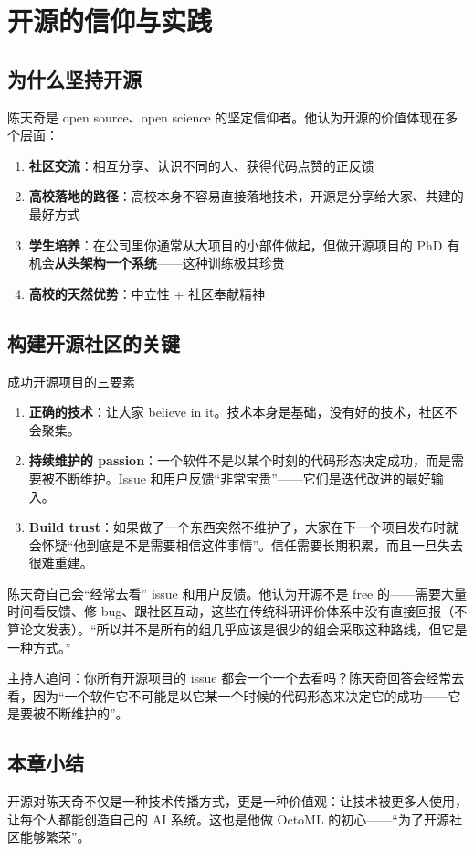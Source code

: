 \section{开源的信仰与实践}

\subsection{为什么坚持开源}

陈天奇是 open source、open science 的坚定信仰者。他认为开源的价值体现在多个层面：

\begin{enumerate}
    \item \textbf{社区交流}：相互分享、认识不同的人、获得代码点赞的正反馈
    \item \textbf{高校落地的路径}：高校本身不容易直接落地技术，开源是分享给大家、共建的最好方式
    \item \textbf{学生培养}：在公司里你通常从大项目的小部件做起，但做开源项目的 PhD 有机会\textbf{从头架构一个系统}------这种训练极其珍贵
    \item \textbf{高校的天然优势}：中立性 + 社区奉献精神
\end{enumerate}

\subsection{构建开源社区的关键}

\begin{importantbox}{成功开源项目的三要素}
\begin{enumerate}
    \item \textbf{正确的技术}：让大家 believe in it。技术本身是基础，没有好的技术，社区不会聚集。
    \item \textbf{持续维护的 passion}：一个软件不是以某个时刻的代码形态决定成功，而是需要被不断维护。Issue 和用户反馈``非常宝贵''------它们是迭代改进的最好输入。
    \item \textbf{Build trust}：如果做了一个东西突然不维护了，大家在下一个项目发布时就会怀疑``他到底是不是需要相信这件事情''。信任需要长期积累，而且一旦失去很难重建。
\end{enumerate}
\end{importantbox}

陈天奇自己会``经常去看'' issue 和用户反馈。他认为开源不是 free 的------需要大量时间看反馈、修 bug、跟社区互动，这些在传统科研评价体系中没有直接回报（不算论文发表）。``所以并不是所有的组几乎应该是很少的组会采取这种路线，但它是一种方式。''

主持人追问：你所有开源项目的 issue 都会一个一个去看吗？陈天奇回答会经常去看，因为``一个软件它不可能是以它某一个时候的代码形态来决定它的成功------它是要被不断维护的''。

\subsection{本章小结}

开源对陈天奇不仅是一种技术传播方式，更是一种价值观：让技术被更多人使用，让每个人都能创造自己的 AI 系统。这也是他做 OctoML 的初心------``为了开源社区能够繁荣''。

